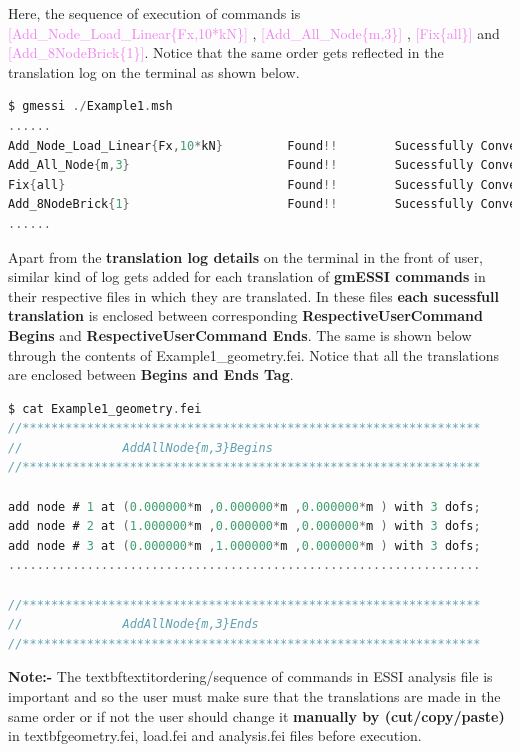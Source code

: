 \documentclass[11pt]{article}
\begin{document}
Here,     the     sequence     of     execution     of     commands     is
\textcolor{violet}{[Add\_Node\_Load\_Linear\{Fx,10*kN\}]}                ,
\textcolor{violet}{[Add\_All\_Node\{m,3\}]}                              ,
\textcolor{violet}{[Fix\{all\}]}                                       and
\textcolor{violet}{[Add\_8NodeBrick\{1\}]}.  Notice  that  the  same order
gets reflected in the translation log on the terminal as shown below.

\begin{lstlisting}[language=C,backgroundcolor=\color{grayish}]
$ gmessi ./Example1.msh
......
Add_Node_Load_Linear{Fx,10*kN}         Found!!        Sucessfully Converted
Add_All_Node{m,3}                      Found!!        Sucessfully Converted
Fix{all}                               Found!!        Sucessfully Converted
Add_8NodeBrick{1}                      Found!!        Sucessfully Converted
......
\end{lstlisting}

Apart from the \textbf{translation log details} on the terminal in the front of user, similar kind of log gets added for each translation of \textbf{gmESSI commands} in their respective files in which they are translated.    
In these files \textbf{each sucessfull translation} is enclosed between corresponding \textbf{RespectiveUserCommand Begins} and \textbf{RespectiveUserCommand Ends}. The same is shown below through the contents of Example1\_geometry.fei. Notice that all the translations are enclosed between \textbf{Begins and Ends Tag}.   

\begin{lstlisting}[language=C]
$ cat Example1_geometry.fei
//****************************************************************
//              AddAllNode{m,3}Begins
//****************************************************************

add node # 1 at (0.000000*m ,0.000000*m ,0.000000*m ) with 3 dofs;         
add node # 2 at (1.000000*m ,0.000000*m ,0.000000*m ) with 3 dofs;         
add node # 3 at (0.000000*m ,1.000000*m ,0.000000*m ) with 3 dofs;                     
..................................................................

//****************************************************************
//              AddAllNode{m,3}Ends
//**************************************************************** 
\end{lstlisting}

\textbf{Note:- } The textbf{textit{ordering/sequence of commands in ESSI
analysis file is important}} and so the user must make sure that the
translations are made in the same order or if not the user should change it
\textbf{manually by (cut/copy/paste)} in textbf{geometry.fei, load.fei and
analysis.fei} files before execution.
\end{document}
